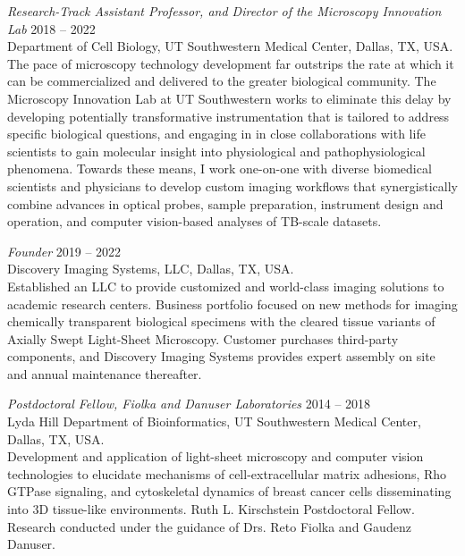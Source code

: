 {\sl Research-Track Assistant Professor, and Director of the Microscopy Innovation Lab} \hfill 2018 -- 2022 \\ 
Department of Cell Biology, UT Southwestern Medical Center, Dallas, TX, USA. \hfill \\
\forceindent The pace of microscopy technology development far outstrips the rate at which it can be commercialized and delivered to the greater biological community.  The Microscopy Innovation Lab at UT Southwestern works to eliminate this delay by developing potentially transformative instrumentation that is tailored to address specific biological questions, and engaging in in close collaborations with life scientists to gain molecular insight into physiological and pathophysiological phenomena. Towards these means, I work one-on-one with diverse biomedical scientists and physicians to develop custom imaging workflows that synergistically combine advances in optical probes, sample preparation, instrument design and operation, and computer vision-based analyses of TB-scale datasets. 

{\sl Founder} \hfill 2019 -- 2022 \\ 
Discovery Imaging Systems, LLC, Dallas, TX, USA. \hfill \\
\forceindent Established an LLC to provide customized and world-class imaging solutions to academic research centers.  Business portfolio focused on new methods for imaging chemically transparent biological specimens with the cleared tissue variants of Axially Swept Light-Sheet Microscopy.  Customer purchases third-party components, and Discovery Imaging Systems provides expert assembly on site and annual maintenance thereafter.

{\sl Postdoctoral Fellow, Fiolka and Danuser Laboratories} \hfill 2014 -- 2018 \\ 
Lyda Hill Department of Bioinformatics, UT Southwestern Medical Center, Dallas, TX, USA. \hfill \\
\forceindent Development and application of light-sheet microscopy and computer vision technologies to elucidate mechanisms of cell-extracellular matrix adhesions, Rho GTPase signaling, and cytoskeletal dynamics of breast cancer cells disseminating into 3D tissue-like environments. Ruth L. Kirschstein Postdoctoral Fellow.  Research conducted under the guidance of Drs. Reto Fiolka and Gaudenz Danuser.

